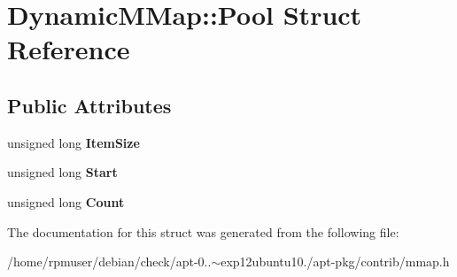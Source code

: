 \section{\-Dynamic\-M\-Map\-:\-:\-Pool \-Struct \-Reference}
\label{structDynamicMMap_1_1Pool}
\subsection*{\-Public \-Attributes}
\begin{DoxyCompactItemize}
\item 
unsigned long {\bfseries \-Item\-Size}\label{structDynamicMMap_1_1Pool_af280c456d0296b2c593491f966371a4d}

\item 
unsigned long {\bfseries \-Start}\label{structDynamicMMap_1_1Pool_addcf1e7575065cf383043105d4c3fd69}

\item 
unsigned long {\bfseries \-Count}\label{structDynamicMMap_1_1Pool_aea0c30b4eedd2bafcd5e7666344c260d}

\end{DoxyCompactItemize}


\-The documentation for this struct was generated from the following file\-:\begin{DoxyCompactItemize}
\item 
/home/rpmuser/debian/check/apt-\/0..$\sim$exp12ubuntu10./apt-\/pkg/contrib/mmap.\-h\end{DoxyCompactItemize}
